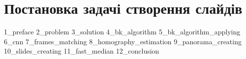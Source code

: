 \chapter{Постановка задачі створення слайдів}
{1_preface}
{2_problem}
{3_solution}
{4_bk_algorithm}
{5_bk_algorithm_applying}
{6_cnn}
{7_frames_matching}
{8_homography_estimation}
{9_panorama_creating}
{10_slides_creating}
{11_fast_median}
{12_conclusion}